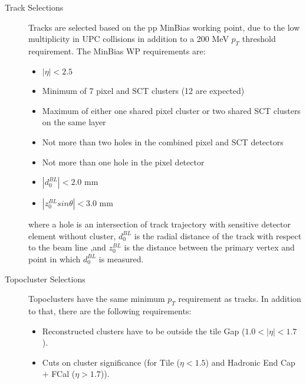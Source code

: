 \begin{description}
	\item [Track Selections] Tracks are selected based on the pp MinBias working point, due to the low multiplicity in UPC collisions  in addition to a 200 MeV $p_T$ threshold requirement. The MinBias WP \cite{aaboud_performance_2017} requirements are:
	\begin{itemize}
		\item $|\eta| < 2.5$
		\item Minimum of 7 pixel and SCT clusters (12 are expected)
		\item Maximum of either one shared pixel cluster or two shared SCT clusters on the same layer
		\item Not more than two holes in the combined pixel and SCT detectors
		\item Not more than one hole in the pixel detector
		\item $|d_{0}^{BL}| < 2.0 $ mm
		\item $|z_{0}^{BL}sin\theta| < 3.0 $ mm
	\end{itemize}
	where a hole is an intersection of track trajectory with sensitive detector element without cluster, $d_{0}^{BL}$ is the radial distance of the track with respect to the beam line ,and $z_{0}^{BL}$  is the distance between the primary vertex and point in which $d_{0}^{BL}$ is measured.
	\item [Topocluster Selections] Topoclusters have the same minimum $p_T$ requirement as tracks. In addition to that, there are the following requirements:
	\begin{itemize}
		\item Reconstructed clusters have to be outside the tile Gap ($1.0 < |\eta| < 1.7$).
		\item Cuts on cluster significance (for Tile  ($\eta < 1.5$) and Hadronic End Cap + FCal ($\eta > 1.7$)).
	\end{itemize}
\end{description}

